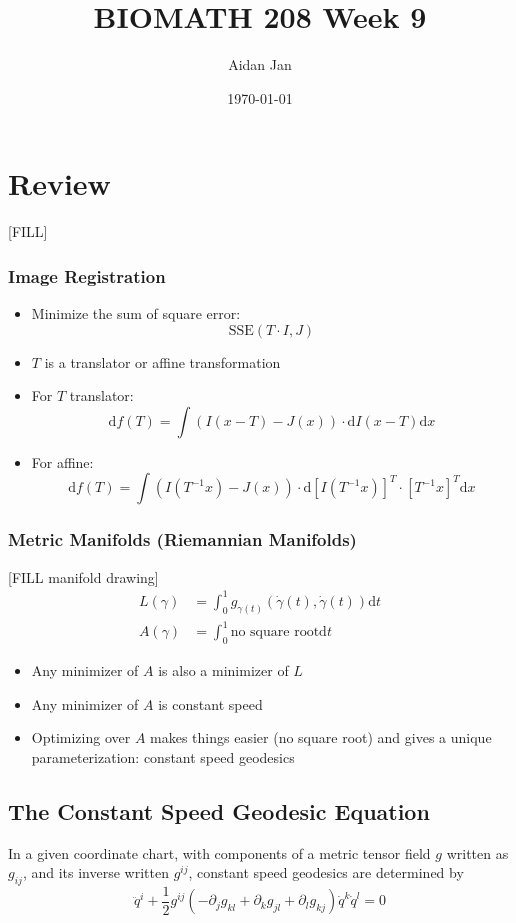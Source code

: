 \documentclass[10pt]{article}
\title{BIOMATH 208 Week 9}
\author{Aidan Jan}
\date{\today}
\newcommand{\dd}{\text{d}}
\begin{document}
\maketitle
\section{Review}
[FILL]

\subsubsection*{Image Registration}
\begin{itemize}
	\item Minimize the sum of square error:
	\[\text{SSE} (T \cdot I, J)\]
    \item $T$ is a translator or affine transformation
    \item For $T$ translator:
    \[\dd f(T) = \int(I(x - T) - J(x)) \cdot \dd I(x - T) \dd x\]
    \item For affine:
    \[\dd f(T) = \int(I(T^{-1}x) - J(x)) \cdot \dd[I(T^{-1}x)]^T \cdot [T^{-1} x]^T \dd x\]
\end{itemize}

\subsubsection*{Metric Manifolds (Riemannian Manifolds)}
[FILL manifold drawing]
\begin{align*}
    L(\gamma) &= \int_0^1 g_{\gamma(t)} (\dot{\gamma} (t), \dot{\gamma}(t)) \dd t\\
    A(\gamma) &= \int_0^1 \text{no square root} \dd t
\end{align*}
\begin{itemize}
	\item Any minimizer of $A$ is also a minimizer of $L$
	\item Any minimizer of $A$ is constant speed
	\item Optimizing over $A$ makes things easier (no square root) and gives a unique parameterization: constant speed geodesics
\end{itemize}

\subsection*{The Constant Speed Geodesic Equation}
In a given coordinate chart, with components of a metric tensor field $g$ written as $g_{ij}$, and its inverse written $g^{ij}$, constant speed geodesics are determined by
\[\ddot{q}^i + \frac{1}{2} g^{ij} (-\partial_j g_{kl} + \partial_k g_{jl} + \partial_l g_{kj}) \dot{q}^k \dot{q}^l = 0\]
\end{document}
